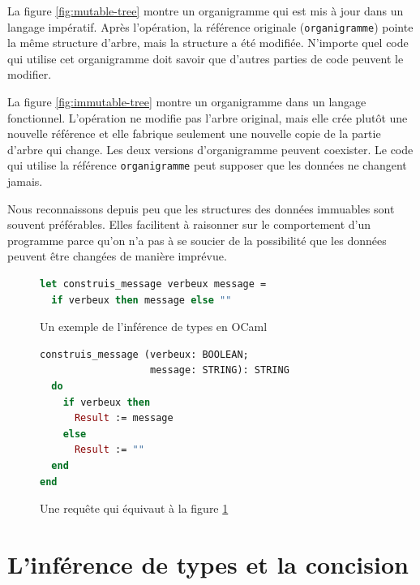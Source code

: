 \documentclass[french]{report}
\begin{document}
La figure \ref{fig:mutable-tree} montre un organigramme qui est mis à jour dans un langage impératif. Après l'opération, la référence originale (\texttt{organigramme}) pointe la même structure d'arbre, mais la structure a été modifiée. N'importe quel code qui utilise cet organigramme doit savoir que d'autres parties de code peuvent le modifier.

La figure \ref{fig:immutable-tree} montre un organigramme dans un langage fonctionnel. L'opération ne modifie pas l'arbre original, mais elle crée plutôt une nouvelle référence et elle fabrique seulement une nouvelle copie de la partie d'arbre qui change. Les deux versions d'organigramme peuvent coexister. Le code qui utilise la référence \texttt{organigramme} peut supposer que les données ne changent jamais.

Nous reconnaissons depuis peu que les structures des données immuables sont souvent préférables. Elles facilitent à raisonner sur le comportement d'un programme parce qu'on n'a pas à se soucier de la possibilité que les données peuvent être changées de manière imprévue.

\begin{figure}[h]
	\begin{lstlisting}[language=Caml]
let construis_message verbeux message = 
  if verbeux then message else ""
	\end{lstlisting}
	
	\caption{Un exemple de l'inférence de types en OCaml\protect\footnotemark}
	\label{fig:type-inference-code}
\end{figure}


\begin{figure}[h]
	\begin{lstlisting}[language=Eiffel]
construis_message (verbeux: BOOLEAN; 
                   message: STRING): STRING
  do
    if verbeux then
      Result := message
    else
      Result := ""
  end
end
	\end{lstlisting}
	\caption{Une requête qui équivaut à la figure \ref{fig:type-inference-code}}
	\label{fig:without-type-inference-code}
\end{figure}

\section{L'inférence de types et la concision}
\end{document}
